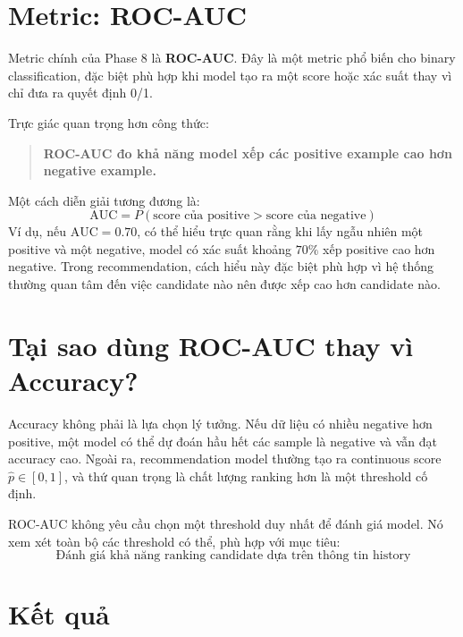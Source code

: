 \documentclass[12pt,a4paper]{article}
\begin{document}
\section{Metric: ROC-AUC}

Metric chính của Phase 8 là \textbf{ROC-AUC}. Đây là một metric phổ biến cho binary classification, đặc biệt phù hợp khi model tạo ra một score hoặc xác suất thay vì chỉ đưa ra quyết định 0/1.

Trực giác quan trọng hơn công thức:
\begin{quote}
\textbf{ROC-AUC đo khả năng model xếp các positive example cao hơn negative example.}
\end{quote}

Một cách diễn giải tương đương là:
\[
\mathrm{AUC} = P(\text{score của positive} > \text{score của negative})
\]
Ví dụ, nếu $\mathrm{AUC} = 0.70$, có thể hiểu trực quan rằng khi lấy ngẫu nhiên một positive và một negative, model có xác suất khoảng $70\%$ xếp positive cao hơn negative. Trong recommendation, cách hiểu này đặc biệt phù hợp vì hệ thống thường quan tâm đến việc candidate nào nên được xếp cao hơn candidate nào.

\section{Tại sao dùng ROC-AUC thay vì Accuracy?}

Accuracy không phải là lựa chọn lý tưởng. Nếu dữ liệu có nhiều negative hơn positive, một model có thể dự đoán hầu hết các sample là negative và vẫn đạt accuracy cao. Ngoài ra, recommendation model thường tạo ra continuous score $\hat{p} \in [0,1]$, và thứ quan trọng là chất lượng ranking hơn là một threshold cố định.

ROC-AUC không yêu cầu chọn một threshold duy nhất để đánh giá model. Nó xem xét toàn bộ các threshold có thể, phù hợp với mục tiêu:
\[
\boxed{ \text{Đánh giá khả năng ranking candidate dựa trên thông tin history} }
\]

\section{Kết quả}
\end{document}
